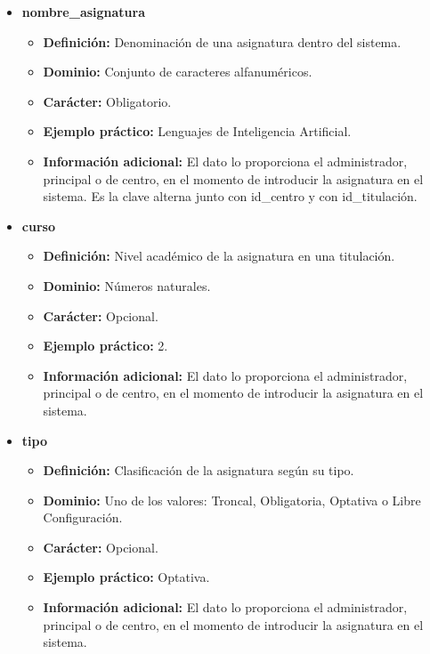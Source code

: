 \begin{description}
\begin{itemize}
\begin{itemize}
      \end{itemize}
   \item \textbf{nombre\_asignatura}
      \begin{itemize}
         \item \textbf{Definición:} Denominación de una asignatura dentro del sistema.
         \item \textbf{Dominio:} Conjunto de caracteres alfanuméricos.
         \item \textbf{Carácter:}  Obligatorio.
         \item \textbf{Ejemplo práctico:} Lenguajes de Inteligencia Artificial.
         \item \textbf{Información adicional:} El dato lo proporciona el administrador, principal o de
         centro, en el momento de introducir la asignatura en el sistema. Es la clave alterna junto con
         id\_centro y con id\_titulación.
      \end{itemize}
   \item \textbf{curso}
      \begin{itemize}
         \item \textbf{Definición:} Nivel académico de la asignatura en una titulación.
         \item \textbf{Dominio:} Números naturales.
         \item \textbf{Carácter:}  Opcional.
         \item \textbf{Ejemplo práctico:} 2.
         \item \textbf{Información adicional:} El dato lo proporciona el administrador, principal o de
         centro, en el momento de introducir la asignatura en el sistema.
      \end{itemize}
   \item \textbf{tipo}
      \begin{itemize}
         \item \textbf{Definición:} Clasificación de la asignatura según su tipo.
         \item \textbf{Dominio:} Uno de los valores: Troncal, Obligatoria, Optativa o Libre Configuración.
         \item \textbf{Carácter:}  Opcional.
         \item \textbf{Ejemplo práctico:} Optativa.
         \item \textbf{Información adicional:} El dato lo proporciona el administrador, principal o de
         centro, en el momento de introducir la asignatura en el sistema.
      \end{itemize}

\end{itemize}
\end{description}
